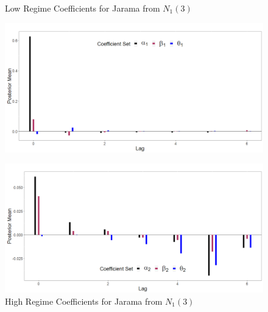 \begin{figure}[!h]
\center
\begin{minipage}[h]{\textwidth}
\caption{Low Regime Coefficients for Jarama from $N_1(3)$}
\label{fig:jar3}
\includegraphics[scale=0.3]{JaramaL3}
\end{minipage} \hspace{\textwidth}
\begin{minipage}[h]{\textwidth}
\caption{High Regime Coefficients for Jarama from $N_1(3)$}
\label{fig:jar4}
\includegraphics[scale=0.3]{JaramaH3}
\end{minipage}
\end{figure}

